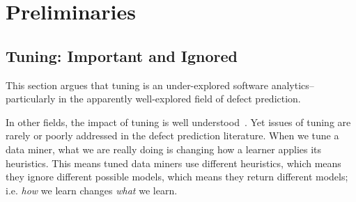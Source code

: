 \documentclass[final,twocolumn,5p]{elsarticle}
\begin{document}



 


\section{Preliminaries} 




\subsection{Tuning: Important and Ignored}
This section argues that   tuning is an under-explored software analytics-- particularly in the apparently  well-explored field of defect prediction.

In  other fields, the impact of tuning is well understood~\cite{Bergstra2012}. 
Yet issues of tuning  are rarely or poorly addressed
in the defect prediction literature.
When we tune a data miner, what we are really doing is changing how a learner applies
its heuristics. This means tuned data miners use different heuristics, which means they ignore different possible models, which means they return different models; i.e.  {\em how} we learn changes {\em what} we learn.
\end{document}
